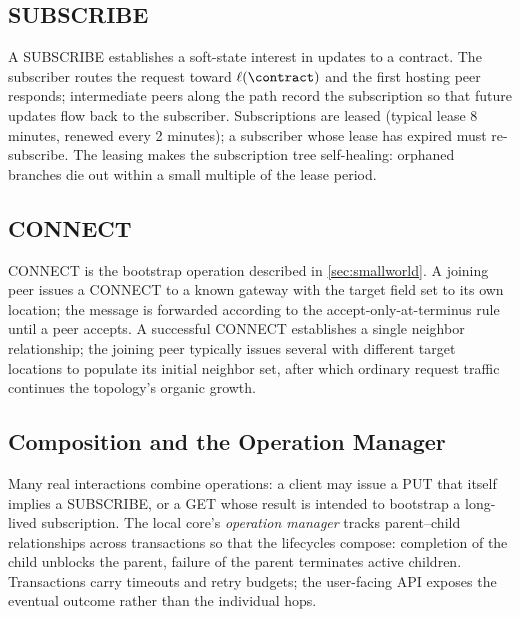 \subsection{\textsf{SUBSCRIBE}}

A \textsf{SUBSCRIBE} establishes a soft-state interest in updates to a contract. The subscriber routes the request toward $\ell(\contract)$ and the first hosting peer responds; intermediate peers along the path record the subscription so that future updates flow back to the subscriber. Subscriptions are leased (typical lease 8 minutes, renewed every 2 minutes); a subscriber whose lease has expired must re-subscribe. The leasing makes the subscription tree self-healing: orphaned branches die out within a small multiple of the lease period.

\subsection{\textsf{CONNECT}}

\textsf{CONNECT} is the bootstrap operation described in \cref{sec:smallworld}. A joining peer issues a \textsf{CONNECT} to a known gateway with the target field set to its own location; the message is forwarded according to the accept-only-at-terminus rule until a peer accepts. A successful \textsf{CONNECT} establishes a single neighbor relationship; the joining peer typically issues several with different target locations to populate its initial neighbor set, after which ordinary request traffic continues the topology's organic growth.

\subsection{Composition and the Operation Manager}

Many real interactions combine operations: a client may issue a \textsf{PUT} that itself implies a \textsf{SUBSCRIBE}, or a \textsf{GET} whose result is intended to bootstrap a long-lived subscription. The local core's \emph{operation manager} tracks parent--child relationships across transactions so that the lifecycles compose: completion of the child unblocks the parent, failure of the parent terminates active children. Transactions carry timeouts and retry budgets; the user-facing API exposes the eventual outcome rather than the individual hops.
